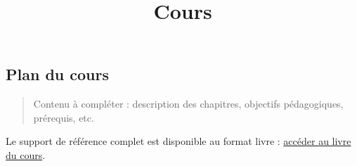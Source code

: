 \documentclass[
  french,
  12pt,
]{article}
\title{Cours}
\author{}
\date{}
\begin{document}
\maketitle


\subsection{Plan du cours}\label{plan-du-cours}

\begin{quote}
Contenu à compléter : description des chapitres, objectifs pédagogiques,
prérequis, etc.
\end{quote}

Le support de référence complet est disponible au format livre :
\href{../../book/index.html}{accéder au livre du cours}.
\end{document}
